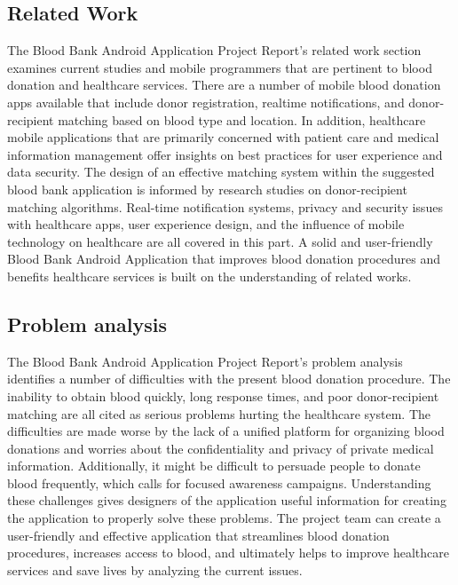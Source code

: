 \subsection{Related Work}
The Blood Bank Android Application Project Report's related work section examines current
studies and mobile programmers that are pertinent to blood donation and healthcare services.
There are a number of mobile blood donation apps available that include donor registration, realtime notifications, and donor-recipient matching based on blood type and location. In addition,
healthcare mobile applications that are primarily concerned with patient care and medical
information management offer insights on best practices for user experience and data security.
The design of an effective matching system within the suggested blood bank application is
informed by research studies on donor-recipient matching algorithms. Real-time notification
systems, privacy and security issues with healthcare apps, user experience design, and the
influence of mobile technology on healthcare are all covered in this part. A solid and user-friendly
Blood Bank Android Application that improves blood donation procedures and benefits
healthcare services is built on the understanding of related works.
\subsection{Problem analysis}
The Blood Bank Android Application Project Report's problem analysis identifies a number of
difficulties with the present blood donation procedure. The inability to obtain blood quickly, long
response times, and poor donor-recipient matching are all cited as serious problems hurting the
healthcare system. The difficulties are made worse by the lack of a unified platform for organizing
blood donations and worries about the confidentiality and privacy of private medical 
information. Additionally, it might be difficult to persuade people to donate blood frequently,
which calls for focused awareness campaigns. Understanding these challenges gives designers of
the application useful information for creating the application to properly solve these problems.
The project team can create a user-friendly and effective application that streamlines blood
donation procedures, increases access to blood, and ultimately helps to improve healthcare
services and save lives by analyzing the current issues.
